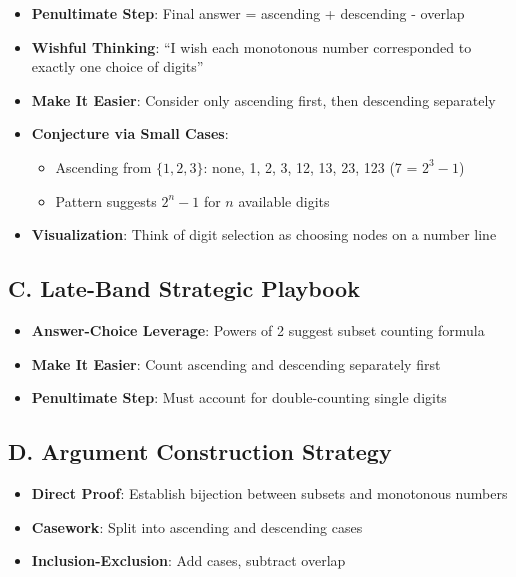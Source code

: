 \documentclass[]{article}
\begin{document}
\begin{strategicbox}
\begin{itemize}[leftmargin=*]
    \item \textbf{Penultimate Step}: Final answer = ascending + descending - overlap
    
    \item \textbf{Wishful Thinking}: ``I wish each monotonous number corresponded to exactly one choice of digits''
    
    \item \textbf{Make It Easier}: Consider only ascending first, then descending separately
    
    \item \textbf{Conjecture via Small Cases}: 
    \begin{itemize}
        \item Ascending from $\{1,2,3\}$: none, 1, 2, 3, 12, 13, 23, 123 (7 = $2^3 - 1$)
        \item Pattern suggests $2^n - 1$ for $n$ available digits
    \end{itemize}
    
    \item \textbf{Visualization}: Think of digit selection as choosing nodes on a number line
\end{itemize}

\subsection*{C. Late-Band Strategic Playbook}
\begin{itemize}[leftmargin=*]
    \item \textbf{Answer-Choice Leverage}: Powers of 2 suggest subset counting formula
    \item \textbf{Make It Easier}: Count ascending and descending separately first
    \item \textbf{Penultimate Step}: Must account for double-counting single digits
\end{itemize}

\subsection*{D. Argument Construction Strategy}
\begin{itemize}[leftmargin=*]
    \item \textbf{Direct Proof}: Establish bijection between subsets and monotonous numbers
    \item \textbf{Casework}: Split into ascending and descending cases
    \item \textbf{Inclusion-Exclusion}: Add cases, subtract overlap
\end{itemize}


\end{strategicbox}
\end{document}

